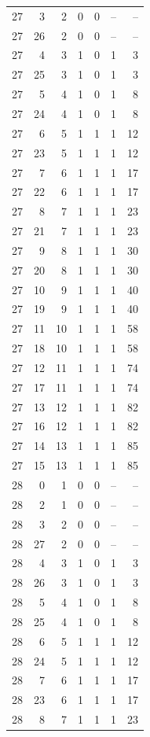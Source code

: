 \begin{longtable}{rrrrrrr}
27 & 3 & 2 & 0 & 0 & -- & --\\
27 & 26 & 2 & 0 & 0 & -- & --\\
27 & 4 & 3 & 1 & 0 & 1 & 3\\
27 & 25 & 3 & 1 & 0 & 1 & 3\\
27 & 5 & 4 & 1 & 0 & 1 & 8\\
27 & 24 & 4 & 1 & 0 & 1 & 8\\
27 & 6 & 5 & 1 & 1 & 1 & 12\\
27 & 23 & 5 & 1 & 1 & 1 & 12\\
27 & 7 & 6 & 1 & 1 & 1 & 17\\
27 & 22 & 6 & 1 & 1 & 1 & 17\\
27 & 8 & 7 & 1 & 1 & 1 & 23\\
27 & 21 & 7 & 1 & 1 & 1 & 23\\
27 & 9 & 8 & 1 & 1 & 1 & 30\\
27 & 20 & 8 & 1 & 1 & 1 & 30\\
27 & 10 & 9 & 1 & 1 & 1 & 40\\
27 & 19 & 9 & 1 & 1 & 1 & 40\\
27 & 11 & 10 & 1 & 1 & 1 & 58\\
27 & 18 & 10 & 1 & 1 & 1 & 58\\
27 & 12 & 11 & 1 & 1 & 1 & 74\\
27 & 17 & 11 & 1 & 1 & 1 & 74\\
27 & 13 & 12 & 1 & 1 & 1 & 82\\
27 & 16 & 12 & 1 & 1 & 1 & 82\\
27 & 14 & 13 & 1 & 1 & 1 & 85\\
27 & 15 & 13 & 1 & 1 & 1 & 85\\
28 & 0 & 1 & 0 & 0 & -- & --\\
28 & 2 & 1 & 0 & 0 & -- & --\\
28 & 3 & 2 & 0 & 0 & -- & --\\
28 & 27 & 2 & 0 & 0 & -- & --\\
28 & 4 & 3 & 1 & 0 & 1 & 3\\
28 & 26 & 3 & 1 & 0 & 1 & 3\\
28 & 5 & 4 & 1 & 0 & 1 & 8\\
28 & 25 & 4 & 1 & 0 & 1 & 8\\
28 & 6 & 5 & 1 & 1 & 1 & 12\\
28 & 24 & 5 & 1 & 1 & 1 & 12\\
28 & 7 & 6 & 1 & 1 & 1 & 17\\
28 & 23 & 6 & 1 & 1 & 1 & 17\\
28 & 8 & 7 & 1 & 1 & 1 & 23\\

\end{longtable}
